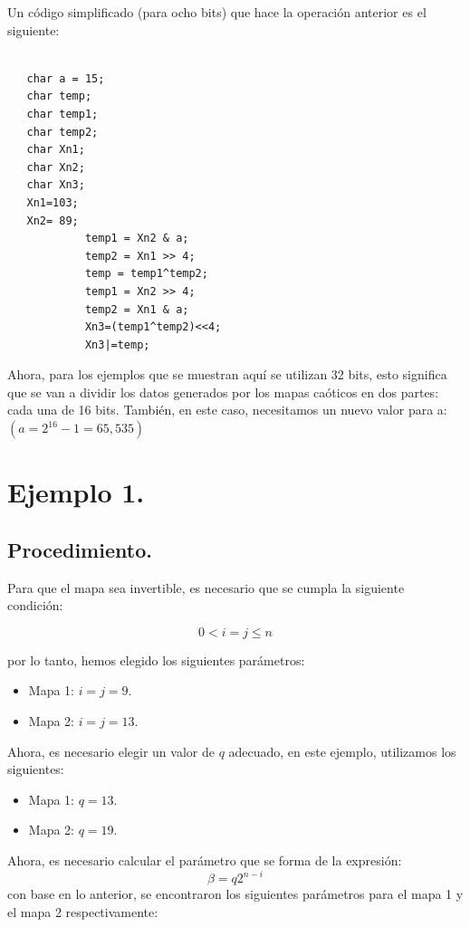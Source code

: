\documentclass[10pt]{IEEEtran}
\begin{document}
Un código simplificado (para ocho bits) que hace la operación anterior es el siguiente:
\begin{verbatim}

   char a = 15;
   char temp;
   char temp1;
   char temp2;
   char Xn1;
   char Xn2;
   char Xn3;
   Xn1=103;
   Xn2= 89;
            temp1 = Xn2 & a;
            temp2 = Xn1 >> 4;
            temp = temp1^temp2;
            temp1 = Xn2 >> 4;
            temp2 = Xn1 & a;
            Xn3=(temp1^temp2)<<4;
            Xn3|=temp;
\end{verbatim}


Ahora, para los ejemplos que se muestran aquí se utilizan 32 bits, esto significa que se van a dividir los datos generados por los mapas caóticos en dos partes: cada una de 16 bits. También, en este caso, necesitamos un nuevo valor para a: $(a = 2^{16}-1= 65,535)$



\section{Ejemplo 1.}

\subsection{Procedimiento.}

Para que el mapa sea invertible, es necesario que se cumpla la siguiente condición:

\begin{equation}
0 < i  = j \leq n
\end{equation}

por lo tanto, hemos elegido los siguientes parámetros:



\begin{itemize}
\item Mapa 1: $i = j = 9$.


\item Mapa 2: $i = j = 13$.
\end{itemize}

Ahora, es necesario elegir un valor de $q$ adecuado, en este ejemplo, utilizamos los siguientes:

\begin{itemize}
\item Mapa 1: $q = 13.$
\item Mapa 2: $q = 19.$
\end{itemize}


Ahora, es necesario calcular el parámetro que se forma de la expresión:  
\begin{equation}
\beta = q 2^{n-i}
\end{equation}
con base en lo anterior, se encontraron los siguientes parámetros para el mapa 1 y el mapa 2 respectivamente:
\end{document}
